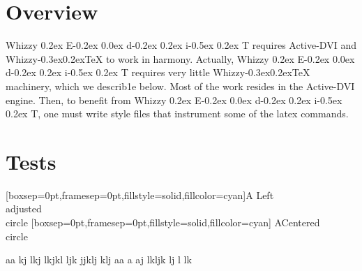 \documentclass[12pt]{article}
\title{\huge \WhizzyEdit}
\author {Didier R{\'e}my}
\makeatletter
\def \ActiveDVI {Active-DVI}
\def \WhizzyTeX {{Whizzy\kern -0.3ex\raise 0.2ex\hbox{\let \@\relax\TeX}}}
\def \WhizzyEdit {Whizzy\sc 
\raise 0.2ex \hbox{E}\kern -0.2ex%
\lower 0.0ex \hbox{d}\kern -0.2ex%
\lower 0.2ex \hbox{i}\kern -0.5ex%
\raise 0.2ex \hbox{T}}%
\makeatother
\begin{document}
\maketitle

\begin{abstract}
This requires the use of \verb"advi" and of a
recent version that recognized \verb"advi: edit" specials.
See the {\ActiveDVI} and {\WhizzyEdit} related parts of the documentaion.
\end{abstract}

\section{Overview}

{\WhizzyEdit} requires {\ActiveDVI} and {\WhizzyTeX} to work in harmony. 
Actually, {\WhizzyEdit} requires very little {\WhizzyTeX} machinery, which we
describ1e below. Most of the work resides in the {\ActiveDVI} engine. 
Then, to benefit from {\WhizzyEdit}, one must write style files that
instrument some of the latex commands. 


\section {Tests}

\vspace {8em}

\makeatletter

\makeatletter

\noindent
{}
  [boxsep=0pt,framesep=0pt,fillstyle=solid,fillcolor=cyan]{A}%
  {Left \\adjusted\\ circle}%
   [boxsep=0pt,framesep=0pt,fillstyle=solid,fillcolor=cyan]%
   {A}{Centered\\ circle}%

  {\hsize \adviw\vbox{aa kj lkj lkjkl ljk jjklj klj  
  {}%
aa a aj lkljk lj l lk }}%
%
  {\hsize \adviw{}}%
%
  {\hsize \adviw{}}%
\end{document}
